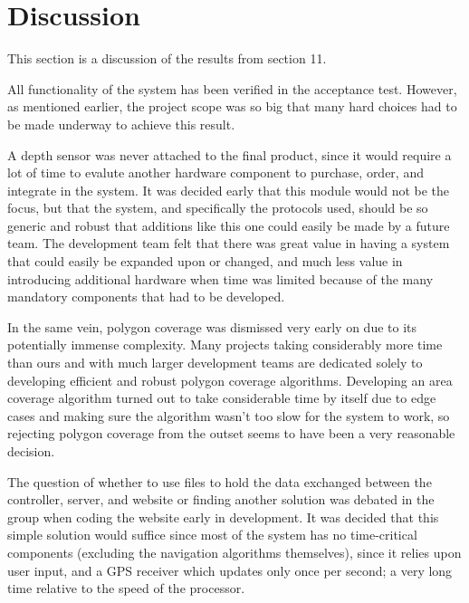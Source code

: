 \newpage
\chapter{Discussion}
This section is a discussion of the results from section 11. 

All functionality of the system has been verified in the acceptance test. However, as mentioned earlier, the project scope was so big that many hard choices had to be made underway to achieve this result.

A depth sensor was never attached to the final product, since it would require a lot of time to evalute another hardware component to purchase, order, and integrate in the system. It was decided early that this module would not be the focus, but that the system, and specifically the protocols used, should be so generic and robust that additions like this one could easily be made by a future team. The development team felt that there was great value in having a system that could easily be expanded upon or changed, and much less value in introducing additional hardware when time was limited because of the many mandatory components that had to be developed. 

In the same vein, polygon coverage was dismissed very early on due to its potentially immense complexity. Many projects taking considerably more time than ours and with much larger development teams are dedicated solely to developing efficient and robust polygon coverage algorithms. Developing an area coverage algorithm turned out to take considerable time by itself due to edge cases and making sure the algorithm wasn't too slow for the system to work, so rejecting polygon coverage from the outset seems to have been a very reasonable decision.

The question of whether to use files to hold the data exchanged between the controller, server, and website or finding another solution was debated in the group when coding the website early in development. It was decided that this simple solution would suffice since most of the system has no time-critical components (excluding the navigation algorithms themselves), since it relies upon user input, and a GPS receiver which updates only once per second; a very long time relative to the speed of the processor. 

